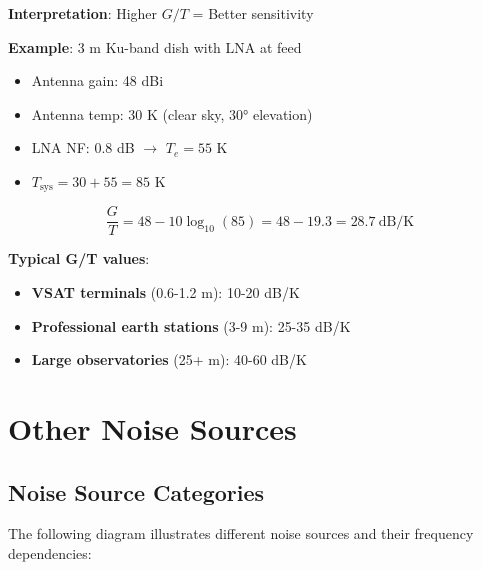 \textbf{Interpretation}: Higher $G/T$ = Better sensitivity

\textbf{Example}: 3 m Ku-band dish with LNA at feed
\begin{itemize}
\item Antenna gain: 48 dBi
\item Antenna temp: 30 K (clear sky, $30°$ elevation)
\item LNA NF: 0.8 dB $\rightarrow$ $T_e = 55$ K
\item $T_{\text{sys}} = 30 + 55 = 85$ K
\end{itemize}

\begin{equation}
\frac{G}{T} = 48 - 10\log_{10}(85) = 48 - 19.3 = 28.7~\text{dB/K}
\end{equation}

\textbf{Typical G/T values}:
\begin{itemize}
\item \textbf{VSAT terminals} (0.6-1.2 m): 10-20 dB/K
\item \textbf{Professional earth stations} (3-9 m): 25-35 dB/K
\item \textbf{Large observatories} (25+ m): 40-60 dB/K
\end{itemize}

\section{Other Noise Sources}

\subsection{Noise Source Categories}

The following diagram illustrates different noise sources and their frequency dependencies:

